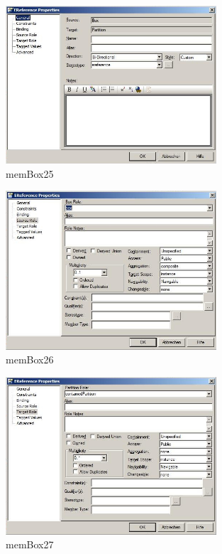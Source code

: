 \begin{figure}[!h]
	\centering
  \includegraphics[width=0.7\textwidth]{pics/memBox25.png}
	\caption{memBox25}
	\label{memBox25}
\end{figure}

\begin{figure}[!h]
	\centering
  \includegraphics[width=0.7\textwidth]{pics/memBox26.png}
	\caption{memBox26}
	\label{memBox26}
\end{figure}

\begin{figure}[!h]
	\centering
  \includegraphics[width=0.7\textwidth]{pics/memBox27.png}
	\caption{memBox27}
	\label{memBox27}
\end{figure}

